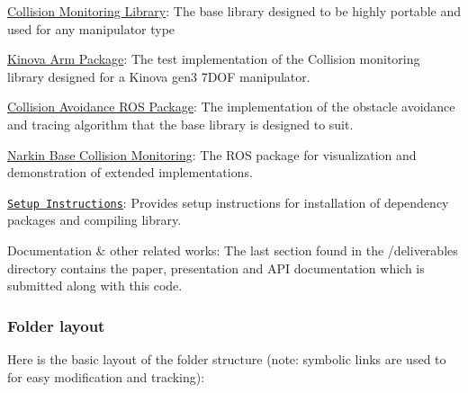 \begin{DoxyItemize}
\item \hyperlink{collision__monitoring_2_r_e_a_d_m_e_8md}{Collision Monitoring Library}\+: The base library designed to be highly portable and used for any manipulator type
\item \hyperlink{md_src_README}{Kinova Arm Package}\+: The test implementation of the Collision monitoring library designed for a Kinova gen3 7\+D\+OF manipulator.
\item \hyperlink{md_catkin_workspace_README}{Collision Avoidance R\+OS Package}\+: The implementation of the obstacle avoidance and tracing algorithm that the base library is designed to suit.
\item \hyperlink{md_catkin_workspace_src_narko_kinova_base_collision_README}{Narkin Base Collision Monitoring}\+: The R\+OS package for visualization and demonstration of extended implementations.
\item \href{setup_instructions.pdf}{\tt Setup Instructions}\+: Provides setup instructions for installation of dependency packages and compiling library.
\item Documentation \& other related works\+: The last section found in the /deliverables directory contains the paper, presentation and A\+PI documentation which is submitted along with this code.
\end{DoxyItemize}

\subsubsection*{Folder layout}

Here is the basic layout of the folder structure (note\+: symbolic links are used to for easy modification and tracking)\+:



